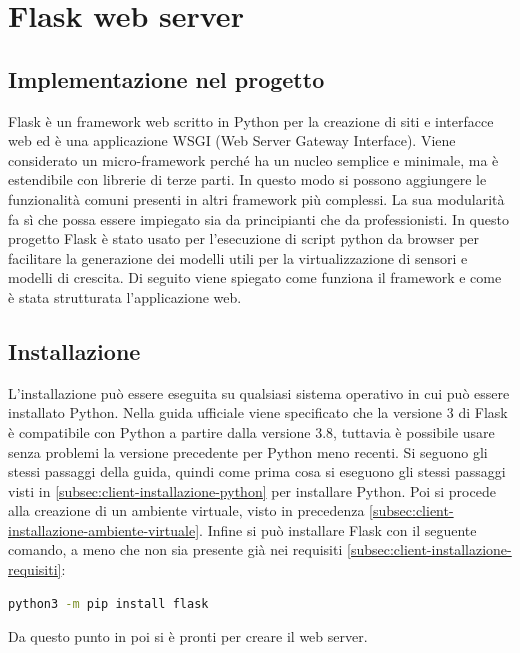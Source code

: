 
\chapter{Flask web server}
\label{ch:flask-web-server}

\section{Implementazione nel progetto}
\label{sec:flask-introduzione}
Flask è un framework web scritto in Python per la creazione di siti e interfacce web
ed è una applicazione WSGI (Web Server Gateway Interface).
Viene considerato un micro-framework perché ha un nucleo semplice e minimale, 
ma è estendibile con librerie di terze parti.
In questo modo si possono aggiungere le funzionalità comuni presenti in altri framework più complessi.
La sua modularità fa sì che possa essere impiegato sia da principianti che da professionisti.
In questo progetto Flask è stato usato per l'esecuzione di script python da browser per facilitare
la generazione dei modelli utili per la virtualizzazione di sensori e modelli di crescita.
Di seguito viene spiegato come funziona il framework e come è stata strutturata l'applicazione web.

\section{Installazione}
\label{sec:flask-installazione}
L'installazione può essere eseguita su qualsiasi sistema operativo in cui può essere installato Python.
Nella guida ufficiale \cite{flask-doc} viene specificato 
che la versione 3 di Flask è compatibile con Python a partire dalla versione 3.8, 
tuttavia è possibile usare senza problemi la versione precedente per Python meno recenti.
Si seguono gli stessi passaggi della guida,
quindi come prima cosa si eseguono gli stessi passaggi visti in \ref{subsec:client-installazione-python} per installare Python.
Poi si procede alla creazione di un ambiente virtuale, visto in precedenza \ref{subsec:client-installazione-ambiente-virtuale}.
Infine si può installare Flask con il seguente comando, a meno che non sia presente già nei requisiti \ref{subsec:client-installazione-requisiti}:
\begin{lstlisting}[language=bash]
	python3 -m pip install flask
\end{lstlisting}
Da questo punto in poi si è pronti per creare il web server.



